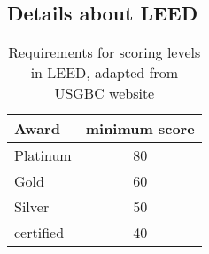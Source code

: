 \documentclass[a4paper,fleqn]{article}
\renewcommand{\cite}{\citep}
\begin{document}
\subsection{Details about LEED}
\begin{table}[H]
	\begin{center}
	\begin{tabular}{| l | c |}
		\hline
		\textbf{Award} & \textbf{minimum score}\\
		\hline
		Platinum & 80 \\
		Gold & 60 \\
		Silver & 50 \\
		certified & 40 \\
		\hline
	\end{tabular}
	\end{center}
	\caption{Requirements for scoring levels in LEED, adapted from USGBC website \cite{LEED2013}}
	\label{tab:LEEDScoreRequirements}
\end{table}
\end{document}
